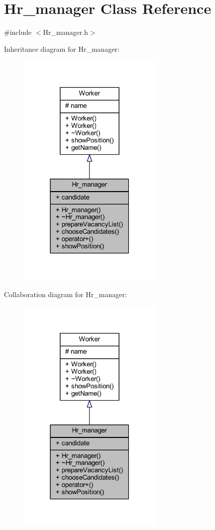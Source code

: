 \hypertarget{class_hr__manager}{}\section{Hr\+\_\+manager Class Reference}
\label{class_hr__manager}


{\ttfamily \#include $<$Hr\+\_\+manager.\+h$>$}



Inheritance diagram for Hr\+\_\+manager\+:
\nopagebreak
\begin{figure}[H]
\begin{center}
\leavevmode
\includegraphics[width=198pt]{class_hr__manager__inherit__graph}
\end{center}
\end{figure}


Collaboration diagram for Hr\+\_\+manager\+:
\nopagebreak
\begin{figure}[H]
\begin{center}
\leavevmode
\includegraphics[width=198pt]{class_hr__manager__coll__graph}
\end{center}
\end{figure}
